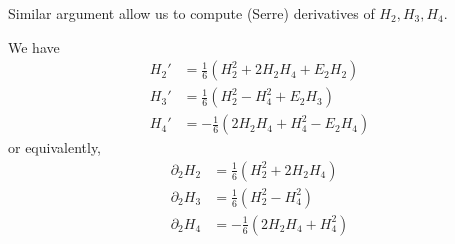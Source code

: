 Similar argument allow us to compute (Serre) derivatives of $H_2, H_3, H_4$.
\begin{proposition}\label{prop:theta-der}
We have
\begin{align}
    H_2' &= \frac{1}{6} (H_{2}^{2} + 2 H_{2} H_{4} + E_2 H_2) \label{eqn:H2-der}\\
    H_3' &= \frac{1}{6} (H_{2}^{2} - H_{4}^{2} + E_2 H_3) \label{eqn:H3-der}\\
    H_4' &= -\frac{1}{6} (2H_{2} H_{4} + H_{4}^{2} - E_2 H_4) \label{eqn:H4-der}
\end{align}
or equivalently,
\begin{align}
    \partial_{2} H_{2} &= \frac{1}{6} (H_{2}^{2} + 2 H_{2} H_{4}) \label{eqn:H2-serre-der} \\
    \partial_{2} H_{3} &= \frac{1}{6} (H_{2}^{2} - H_{4}^{2}) \label{eqn:H3-serre-der} \\
    \partial_{2} H_{4} &= -\frac{1}{6} (2H_{2} H_{4} + H_{4}^{2}) \label{eqn:H4-serre-der}
\end{align}
\end{proposition}
